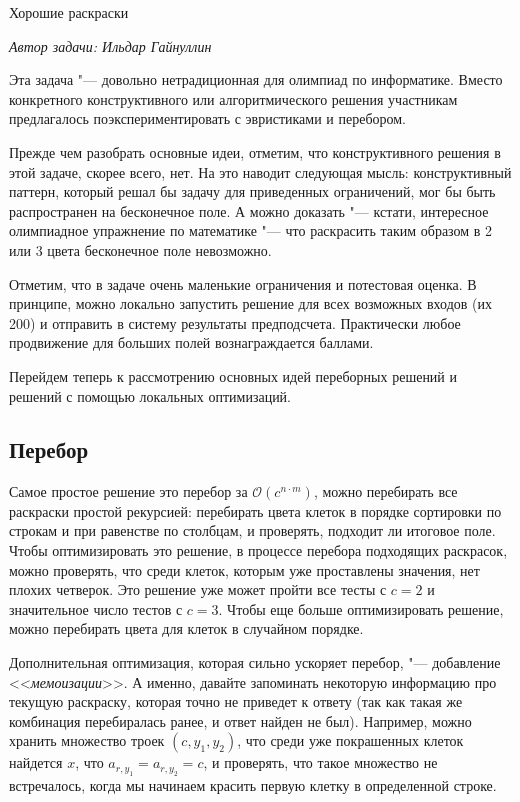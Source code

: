 \begin{tutorial}{Хорошие раскраски}

\medskip
\textit{Автор задачи: Ильдар Гайнуллин}
\medskip

Эта задача "--- довольно нетрадиционная для олимпиад по информатике. Вместо конкретного конструктивного или алгоритмического решения участникам предлагалось поэкспериментировать с эвристиками и перебором.

Прежде чем разобрать основные идеи, отметим, что конструктивного решения в этой задаче, скорее всего, нет. На это наводит следующая мысль: конструктивный паттерн, который решал бы задачу для приведенных ограничений, мог бы быть распространен на бесконечное поле. А можно доказать "--- кстати, интересное олимпиадное упражнение по математике "--- что раскрасить таким образом в 2 или 3 цвета бесконечное поле невозможно.

Отметим, что в задаче очень маленькие ограничения и потестовая оценка. В принципе, можно локально запустить решение для всех возможных входов (их 200) и отправить в систему результаты предподсчета. Практически любое продвижение для больших полей вознаграждается баллами.

Перейдем теперь к рассмотрению основных идей переборных решений и решений с помощью локальных оптимизаций.

\subsection*{Перебор}
Самое простое решение это перебор за $\mathcal{O}(c^{n \cdot m})$, можно перебирать все раскраски простой рекурсией: перебирать цвета клеток в порядке сортировки по строкам и при равенстве по столбцам, и проверять, подходит ли итоговое поле. Чтобы оптимизировать это решение, в процессе перебора подходящих раскрасок, можно проверять, что среди клеток, которым уже проставлены значения, нет плохих четверок. Это решение уже может пройти все тесты с $c=2$ и значительное число тестов с $c=3$. Чтобы еще больше оптимизировать решение, можно перебирать цвета для клеток в случайном порядке. 

Дополнительная оптимизация, которая сильно ускоряет перебор, "--- добавление <<\textit{мемоизации}>>. А именно, давайте запоминать некоторую информацию про текущую раскраску, которая точно не приведет к ответу (так как такая же комбинация перебиралась ранее, и ответ найден не был). Например, можно хранить множество троек $(c, y_1, y_2)$, что среди уже покрашенных клеток найдется $x$, что $a_{r,y_1}=a_{r,y_2}=c$, и проверять, что такое множество не встречалось, когда мы начинаем красить первую клетку в определенной строке.


\end{tutorial}
